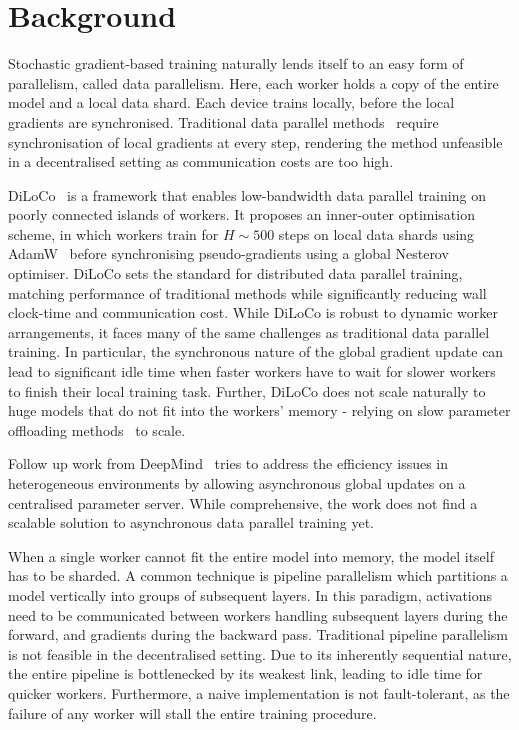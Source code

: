 \documentclass[conference, 10pt]{IEEEtran}
\begin{document}

\section{Background}
\label{sec:background}

Stochastic gradient-based training naturally lends itself to an easy form of
parallelism, called data parallelism. Here, each worker holds a copy of the
entire model and a local data shard. Each device trains locally, before the local
gradients are synchronised. Traditional data parallel methods~\cite{mcmahan2016}
require synchronisation of local gradients at every step, rendering the method
unfeasible in a decentralised setting as communication costs are too high.

DiLoCo~\cite{douillard2023} is a framework that enables low-bandwidth data
parallel training on poorly connected islands of workers. It proposes an
inner-outer optimisation scheme, in which workers train for $H\sim 500$ steps on
local data shards using AdamW~\cite{loshchilov2019} before synchronising
pseudo-gradients using a global Nesterov optimiser. DiLoCo sets the standard for
distributed data parallel training, matching performance of traditional methods
while significantly reducing wall clock-time and communication cost. While
DiLoCo is robust to dynamic worker arrangements, it faces many of the same
challenges as traditional data parallel training. In particular, the synchronous
nature of the global gradient update can lead to significant idle time when
faster workers have to wait for slower workers to finish their local training
task. Further, DiLoCo does not scale naturally to huge models that do not fit
into the workers' memory - relying on slow parameter offloading
methods~\cite{rhu2016, cui2016} to scale.

Follow up work from DeepMind~\cite{li2024} tries to address the efficiency
issues in heterogeneous environments by allowing asynchronous global updates on
a centralised parameter server. While comprehensive, the work does not find a
scalable solution to asynchronous data parallel training yet.


When a single worker cannot fit the entire model into memory, the model itself
has to be sharded. A common technique is pipeline parallelism which partitions a
model vertically into groups of subsequent layers. In this paradigm, activations
need to be communicated between workers handling subsequent layers during the
forward, and gradients during the backward pass. Traditional pipeline
parallelism is not feasible in the decentralised setting. Due to its inherently
sequential nature, the entire pipeline is bottlenecked by its weakest link,
leading to idle time for quicker workers. Furthermore, a naive implementation is
not fault-tolerant, as the failure of any worker will stall the entire training
procedure.
\end{document}
